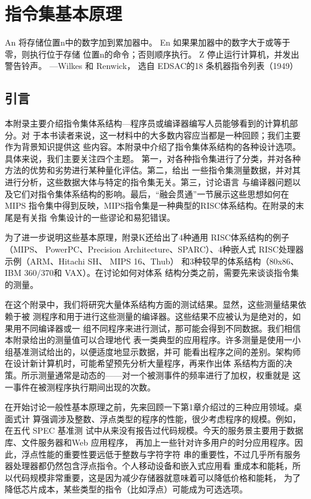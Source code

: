 
\chapter{指令集基本原理}
An 将存储位置n中的数字加到累加器中。
En 如果果加器中的数字大于或等于零，则执行位于存储
位置n的命令；否则顺序执行。
Z 停止运行计算机，并发出警告铃声。
—Wilkes 和 Renwick，
选自 EDSAC的18 条机器指令列表（1949）

\section{引言}
本附录主要介绍指令集体系结构—程序员或编译器编写人员能够看到的计算机部分。对
于本书读者来说，这一材料中的大多数内容应当都是一种回顾；我们主要作为背景知识提供这
些内容。本附录中介绍了指令集体系结构的各种设计选项。具体来说，我们主要关注四个主题。
第一，对各种指令集进行了分类，并对各种方法的优势和劣势进行某种量化评估。第二，给出
一些指令集测量数据，并对其进行分析，这些数据大体与特定的指令集无关。第三，讨论语言
与编译器问题以及它们对指令集体系结构的影响。最后，“融会贯通”一节展示这些思想如何在
MIPS 指令集中得到反映，MIPS指令集是一种典型的RISC体系结构。在附录的末尾是有关指
令集设计的一些谬论和易犯错误。

为了进一步说明这些基本原理，附录K还给出了4种通用 RISC体系结构的例子（MIPS、
PowerPC、Precision Architecture、SPARC）、4种嵌人式 RISC处理器示例（ARM、Hitachi SH、
MIPS 16、Thub） 和3种较早的体系结构（80x86、IBM 360/370和 VAX）。在讨论如何对体系
结构分类之前，需要先来谈谈指令集的测量。

在这个附录中，我们将研究大量体系结构方面的测试结果。显然，这些测量结果依赖于被
测程序和用于进行这些测量的编译器。这些结果不应被认为是绝对的，如果用不同编译器或一
组不同程序来进行测试，那可能会得到不同数据。我们相信本附录给出的测量值可以合理地代
表一类典型的应用程序。许多测量是使用一小组基准测试给出的，以便适度地显示数据，并可
能看出程序之间的差别。架构师在设计新计算机时，可能希望预先分析大量程序，再来作出体
系结构方面的决策。所示测量通常是动态的——对一个被测事件的频率进行了加权，权重就是
这一事件在被测程序执行期间出现的次数。

在开始讨论一般性基本原理之前，先来回顾一下第1章介绍过的三种应用领域。桌面式计
算强调涉及整数、浮点类型的程序的性能，很少考虑程序的规模。例如，在五代 SPEC 基准测
试中从来没有报告过代码规模。今天的服务景主要用于数据库、文件服务器和Web 应用程序，
再加上一些针对许多用户的时分应用程序。因此，浮点性能的重要性要远低于整数与字符字符
串的重要性，不过几乎所有服务器处理器都仍然包含浮点指令。个人移动设备和嵌入式应用看
重成本和能耗，所以代码规模非常重要，这是因为减少存储器就意味着可以降低价格和能耗，
为了降低芯片成本，某些类型的指令（比如浮点）可能成为可选选项。

